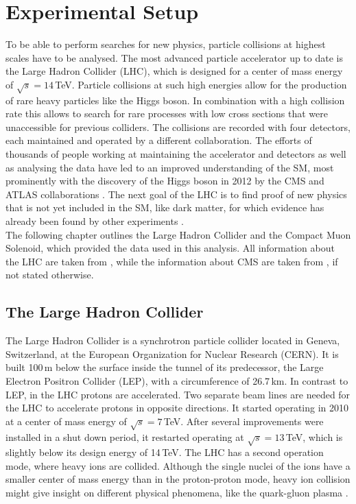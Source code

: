 \chapter{Experimental Setup}
\label{chap:expsetup}
To be able to perform searches for new physics, particle collisions at highest scales have to be analysed. The most advanced particle accelerator up to date is the Large Hadron Collider (LHC), which is designed for a center of mass energy of $\sqrt{s}= 14$\,TeV. Particle collisions at such high energies allow for the production of rare heavy particles like the Higgs boson. In combination with a high collision rate this allows to search for rare processes with low cross sections that were unaccessible for previous colliders. The collisions are recorded with four detectors, each maintained and operated by a different collaboration. The efforts of thousands of people working at maintaining the accelerator and detectors as well as analysing the data have led to an improved understanding of the SM, most prominently with the discovery of the Higgs boson in 2012 by the CMS \cite{cms_higgsdiscov} and ATLAS collaborations \cite{atlas_higgsdiscov}. The next goal of the LHC is to find proof of new physics that is not yet included in the SM, like dark matter, for which evidence has already been found by other experiments \cite{rotcurves,nuoszi3}.\\

\noindent The following chapter outlines the Large Hadron Collider and the Compact Muon Solenoid, which provided the data used in this analysis. All information about the LHC are taken from \cite{lhc_machine}, while the information about CMS are taken from \cite{CMS_design,strip_fig}, if not stated otherwise.

\section{The Large Hadron Collider}
The Large Hadron Collider is a synchrotron particle collider located in Geneva, Switzerland, at the European Organization for Nuclear Research (CERN). It is built 100\,m below the surface inside the tunnel of its predecessor, the Large Electron Positron Collider (LEP), with a circumference of 26.7\,km. In contrast to LEP, in the LHC protons are accelerated. Two separate beam lines are needed for the LHC to accelerate protons in opposite directions. It started operating in 2010 at a center of mass energy of $\sqrt{s}=7$\,TeV. After several improvements were installed in a shut down period, it restarted operating at $\sqrt{s}=13$\,TeV, which is slightly below its design energy of 14\,TeV. The LHC has a second operation mode, where heavy ions are collided. Although the single nuclei of the ions have a smaller center of mass energy than in the proton-proton mode, heavy ion collision might give insight on different physical phenomena, like the quark-gluon plasma \cite{quarkgluonplasma}.\\

